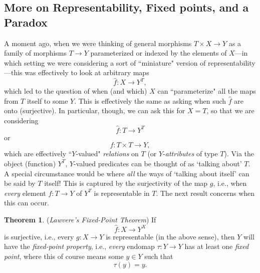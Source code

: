 \documentclass[11pt]{book}
\theoremstyle{definition}
\theoremstyle{definition}
\theoremstyle{definition}
\newtheorem{theorem}{Theorem}[section]
\theoremstyle{theorem}
\theoremstyle{definition}
\begin{document}
\subsection{More on Representability, Fixed points, and a Paradox}
A moment ago, when we were thinking of general morphisms $T \times X \rightarrow Y$ as a family of morphisms $T \rightarrow Y$ parameterized or indexed by the elements of $X$---in which setting we were considering a sort of ``miniature" version of  representability---this was effectively to look at arbitrary maps
\begin{equation*}
\hat{f}: X \rightarrow Y^T,
\end{equation*}   
which led to the question of when (and which) $X$ can ``parameterize" all the maps from $T$ itself to some $Y$. This is effectively the same as asking when such $\hat{f}$ are onto (surjective). In particular, though, we can ask this for $X = T$, so that we are considering 
\begin{equation*}
\hat{f}: T \rightarrow Y^T
\end{equation*}   
or 
\begin{equation*}
f: T \times T \rightarrow Y,
\end{equation*}     
which are effectively ``$Y$-valued" \textit{relations} on $T$ (or $Y$-\textit{attributes} of type $T$).
Via the object (function) $Y^T$, $Y$-valued predicates can be thought of as `talking about' $T$. A special circumstance would be where \textit{all} the ways of `talking about itself' can be said by $T$ itself! This is captured by the surjectivity of the map $g$, i.e., when \textit{every} element $f: T \rightarrow Y$ of $Y^T$ is representable in $T$. The next result concerns when this can occur.   
\begin{theorem}
	(\textit{Lawvere's Fixed-Point Theorem})  If
	\begin{equation*}
	\hat{f}: X \rightarrow Y^X
	\end{equation*}
	is surjective, i.e., every $g: X \rightarrow Y$ is representable (in the above sense), then $Y$ will have the \textit{fixed-point property}, i.e., \textit{every} endomap $\tau: Y \rightarrow Y$ has at least one \textit{fixed point}, where this of course means some $y \in Y$ such that 
	\begin{equation*}
	\tau(y) = y. 
	\end{equation*} 
\end{theorem}
\end{document}
